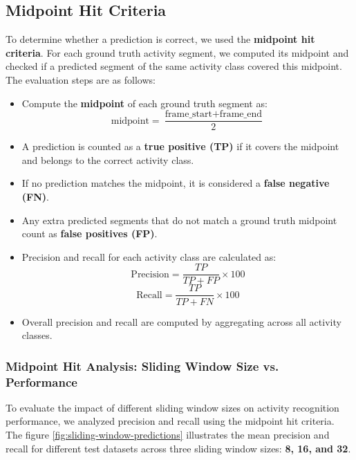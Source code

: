 \documentclass{article}
\begin{document}
\subsection{Midpoint Hit Criteria}

To determine whether a prediction is correct, we used the \textbf{midpoint hit criteria}. For each ground truth activity segment, we computed its midpoint and checked if a predicted segment of the same activity class covered this midpoint. The evaluation steps are as follows:

\begin{itemize}
    \item Compute the \textbf{midpoint} of each ground truth segment as:
    \begin{equation}
        \text{midpoint} = \frac{\text{frame\_start} + \text{frame\_end}}{2}
    \end{equation}
    \item A prediction is counted as a \textbf{true positive (TP)} if it covers the midpoint and belongs to the correct activity class.
    \item If no prediction matches the midpoint, it is considered a \textbf{false negative (FN)}.
    \item Any extra predicted segments that do not match a ground truth midpoint count as \textbf{false positives (FP)}.
    \item Precision and recall for each activity class are calculated as:
    \begin{equation}
        \text{Precision} = \frac{TP}{TP + FP} \times 100
    \end{equation}
    \begin{equation}
        \text{Recall} = \frac{TP}{TP + FN} \times 100
    \end{equation}
    \item Overall precision and recall are computed by aggregating across all activity classes.
\end{itemize}

\subsubsection{Midpoint Hit Analysis: Sliding Window Size vs. Performance}

To evaluate the impact of different sliding window sizes on activity recognition performance, we analyzed precision and recall using the midpoint hit criteria. The figure \ref{fig:sliding-window-predictions} illustrates the mean precision and recall for different test datasets across three sliding window sizes: \textbf{8, 16, and 32}.
\end{document}
